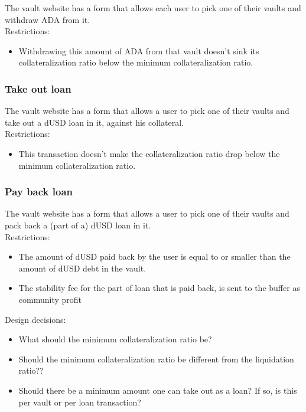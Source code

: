 \documentclass{article} %
\begin{document}
The vault website has a form that allows each user to pick one of their vaults
and withdraw ADA from it. \\

Restrictions:
\begin{itemize}
  \item Withdrawing this amount of ADA from that vault doesn't sink its
    collateralization ratio below the minimum collateralization ratio.
\end{itemize}

\subsubsection{Take out loan}

The vault website has a form that allows a user to pick one of their vaults and
take out a dUSD loan in it, against his collateral. \\

Restrictions:
\begin{itemize}
  \item This transaction doesn't make the collateralization ratio drop below the
    minimum collateralization ratio.
\end{itemize}


\subsubsection{Pay back loan}

The vault website has a form that allows a user to pick one of their vaults and
pack back a (part of a) dUSD loan in it. \\

Restrictions:
\begin{itemize}
  \item The amount of dUSD paid back by the user is equal to or smaller than the
    amount of dUSD debt in the vault.
  \item The stability fee for the part of loan that is paid back, is sent to the
    buffer as community profit
\end{itemize}

Design decisions:
\begin{itemize}
  \item What should the minimum collateralization ratio be?
  \item Should the minimum collateralization ratio be different from the
    liquidation ratio??
  \item Should there be a minimum amount one can take out as a loan? If so, is
    this per vault or per loan transaction?
\end{itemize}
\end{document}
